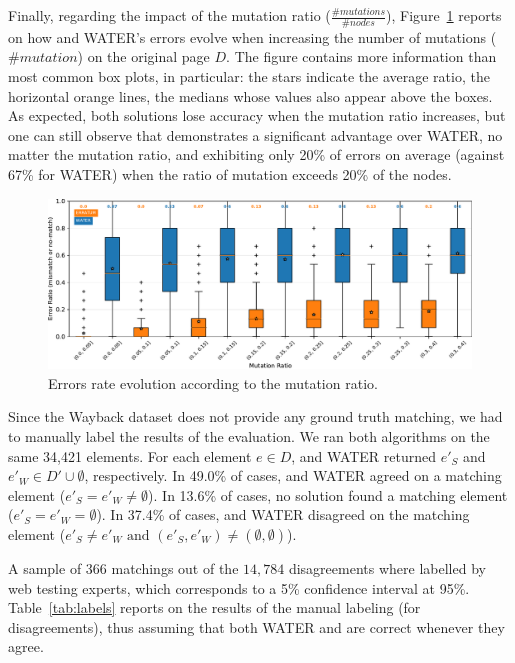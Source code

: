 \documentclass[preprint, 12pt]{elsarticle}
\begin{document}
Finally, regarding the impact of the mutation ratio ($\frac{\#mutations}{\#nodes}$), Figure~\ref{fig:erroRatioMutation} reports on how \erratum and WATER's errors evolve when increasing the number of mutations ($\#mutation$) on the original page $D$.
The figure contains more information than most common box plots, in particular: the stars indicate the average ratio, the horizontal orange lines, the medians whose values also appear above the boxes.
As expected, both solutions lose accuracy when the mutation ratio increases, but one can still observe that \erratum demonstrates a significant advantage over WATER, no matter the mutation ratio, and exhibiting only 20\% of errors on average (against 67\% for WATER) when the ratio of mutation exceeds 20\% of the nodes.

\begin{figure}[]
  \centering
  \includegraphics[width=1\linewidth]{errorPerMutationRatio}
  \caption{Errors rate evolution according to the mutation ratio.}
  \label{fig:erroRatioMutation}
\end{figure}


\vspace{6pt}
Since the {\sc Wayback} dataset does not provide any ground truth matching, we had to manually label the results of the evaluation.
We ran both algorithms on the same 34,421 elements.
For each element $e \in D$, \erratum and WATER returned $e'_{S}$ and $e'_{W} \in D' \cup \emptyset$, respectively.
In 49.0\% of cases, \erratum and WATER agreed on a matching element ($e'_{S} = e'_{W} \ne \emptyset$).
In 13.6\% of cases, no solution found a matching element ($e'_{S} = e'_{W}= \emptyset$).
In 37.4\% of cases, \erratum and WATER disagreed on the matching element ($e'_{S} \ne e'_{W} \text{ and } (e'_{S}, e'_{W}) \ne (\emptyset, \emptyset)$).

A sample of $366$ matchings out of the $14,784$ disagreements where labelled by web testing experts, which corresponds to a 5\% confidence interval at 95\%.
Table~\ref{tab:labels} reports on the results of the manual labeling (for disagreements), thus assuming that both WATER and \erratum are correct whenever they agree.
\end{document}
